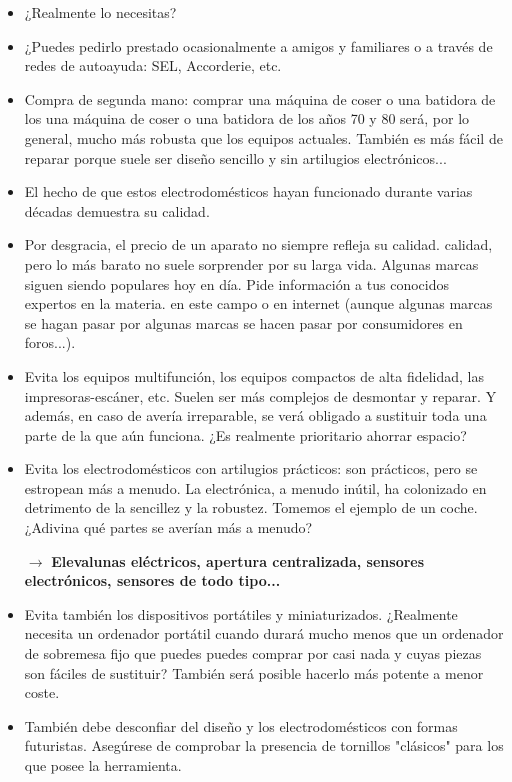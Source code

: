 \begin{itemize}
\item ¿Realmente lo necesitas?
\item ¿Puedes pedirlo prestado ocasionalmente a amigos y familiares
o a través de redes de autoayuda: SEL, Accorderie, etc.
\item Compra de segunda mano: comprar una máquina de coser o una batidora de los
una máquina de coser o una batidora de los años 70 y 80 será, por lo general, mucho más robusta que los equipos actuales. También es más fácil de reparar porque suele ser diseño sencillo y sin artilugios electrónicos...
\item El hecho de que estos electrodomésticos hayan funcionado durante varias décadas demuestra su calidad.
\item Por desgracia, el precio de un aparato no siempre refleja su calidad.
calidad, pero lo más barato no suele sorprender por su larga
vida. Algunas marcas siguen siendo populares hoy en día. 
Pide información a tus conocidos expertos en la materia.
en este campo o en internet (aunque algunas marcas se hagan pasar por
algunas marcas se hacen pasar por consumidores en foros...).
\item Evita los equipos multifunción, los equipos compactos de alta fidelidad, las impresoras-escáner, etc. Suelen ser más complejos de desmontar y reparar. Y además, en caso de avería irreparable, se verá obligado a sustituir toda una parte de la que aún funciona.
¿Es realmente prioritario ahorrar espacio?
\item Evita los electrodomésticos con artilugios prácticos: son prácticos, pero se estropean más a menudo. La electrónica, a menudo inútil, ha colonizado en detrimento de la sencillez y la robustez.
Tomemos el ejemplo de un coche. ¿Adivina qué partes se averían más a menudo?

$\rightarrow$ \textbf{Elevalunas eléctricos, apertura centralizada, sensores electrónicos, sensores de todo tipo...}

\item Evita también los dispositivos portátiles y miniaturizados.
¿Realmente necesita un ordenador portátil cuando durará mucho menos que un ordenador de sobremesa fijo que puedes puedes comprar por casi nada y cuyas piezas son fáciles de sustituir?
También será posible hacerlo más potente a menor coste.

\item También debe desconfiar del diseño y los electrodomésticos con
formas futuristas. Asegúrese de comprobar la presencia de tornillos "clásicos" para los que posee la herramienta. 


\end{itemize}

